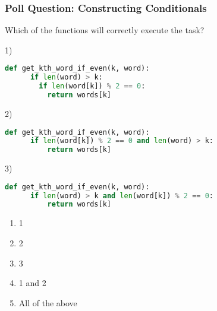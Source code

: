 \documentclass{beamer}
\begin{document}
%
%
\begin{frame}[fragile]
	\frametitle{Poll Question: Constructing Conditionals}
  Which of the functions will correctly execute the task?
	\vfill
	\begin{minipage}{0.7\textwidth}
    1)
		\begin{lstlisting}[language=Python, autogobble,basicstyle=\tiny,numbers=none]
    def get_kth_word_if_even(k, word):
      if len(word) > k:
        if len(word[k]) % 2 == 0:
          return words[k]
		\end{lstlisting}
    2)
		\begin{lstlisting}[language=Python, autogobble,basicstyle=\tiny,numbers=none]
    def get_kth_word_if_even(k, word):
      if len(word[k]) % 2 == 0 and len(word) > k:
          return words[k]
		\end{lstlisting}
    3)
		\begin{lstlisting}[language=Python, autogobble,basicstyle=\tiny,numbers=none]
    def get_kth_word_if_even(k, word):
      if len(word) > k and len(word[k]) % 2 == 0:
          return words[k]
		\end{lstlisting}
	\end{minipage}
  \begin{minipage}{0.29\textwidth}
    \begin{enumerate}[A]
      \item 1
      \item 2
      \item 3
      \item 1 and 2
      \item All of the above
    \end{enumerate}
	\end{minipage}
\end{frame}
\end{document}
